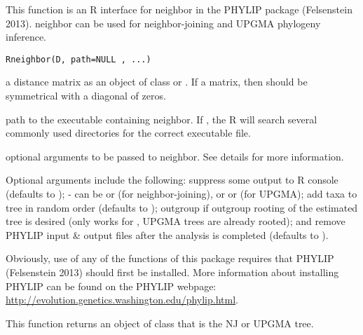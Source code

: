 \documentclass[a4paper]{book}
\begin{document}
%
\begin{Description}\relax
This function is an R interface for neighbor in the PHYLIP package (Felsenstein 2013). neighbor can be used for neighbor-joining and UPGMA phylogeny inference.
\end{Description}
%
\begin{Usage}
\begin{verbatim}
Rneighbor(D, path=NULL , ...)
\end{verbatim}
\end{Usage}
%
\begin{Arguments}
\begin{ldescription}
\item[\code{D}] a distance matrix as an object of class  or . If a matrix, then  should be symmetrical with a diagonal of zeros.
\item[\code{path}] path to the executable containing neighbor. If , the R will search several commonly used directories for the correct executable file.
\item[\code{...}] optional arguments to be passed to neighbor. See details for more information.
\end{ldescription}
\end{Arguments}
%
\begin{Details}\relax
Optional arguments include the following:  suppress some output to R console (defaults to );  - can be  or  (for neighbor-joining), or  or  (for UPGMA);  add taxa to tree in random order (defaults to );  outgroup if outgroup rooting of the estimated tree is desired (only works for , UPGMA trees are already rooted); and  remove PHYLIP input \& output files after the analysis is completed (defaults to ).

Obviously, use of any of the functions of this package requires that PHYLIP (Felsenstein 2013) should first be installed. More information about installing PHYLIP can be found on the PHYLIP webpage: \url{http://evolution.genetics.washington.edu/phylip.html}.
\end{Details}
%
\begin{Value}
This function returns an object of class  that is the NJ or UPGMA tree.
\end{Value}
\end{document}
